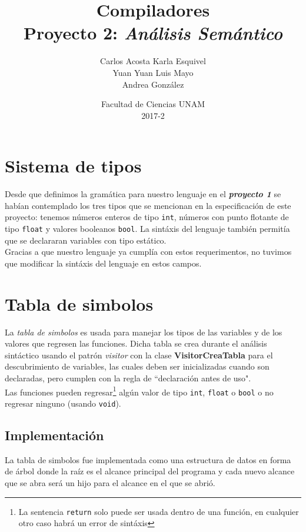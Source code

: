 \documentclass[12pt]{article}
\title{Compiladores\\ Proyecto 2: \emph{Análisis Semántico}}
\author{Carlos Acosta \qquad Karla Esquivel \\ Yuan Yuan \qquad Luis Mayo \\ Andrea González}
\date{Facultad de Ciencias UNAM \\ 2017-2}
\begin{document}
\maketitle
\tableofcontents
\newpage

\section{Sistema de tipos}
Desde que definimos la gramática para nuestro lenguaje en el \textbf{\emph{proyecto 1}} se habían contemplado los tres tipos que se mencionan en la especificación de este proyecto: tenemos números enteros de tipo \texttt{int}, números con punto flotante de tipo \texttt{float} y valores booleanos \texttt{bool}.
La sintáxis del lenguaje también permitía que se declararan variables con tipo estático. \\
Gracias a que nuestro lenguaje ya cumplía con estos requerimentos, no tuvimos que modificar la sintáxis del lenguaje en estos campos.

\section{Tabla de simbolos}
La \textit{tabla de simbolos} es usada para manejar los tipos de las variables y de los valores que regresen las funciones. Dicha tabla se crea durante el análisis sintáctico usando el patrón \textit{visitor} con la clase \textbf{VisitorCreaTabla} para el descubrimiento de variables, las cuales deben ser inicializadas cuando son declaradas, pero cumplen con la regla de ``declaración antes de uso". \\
Las funciones pueden regresar\footnote{La sentencia \texttt{return} solo puede ser usada dentro de una función, en cualquier otro caso habrá un error de sintáxis} algún valor de tipo \texttt{int}, \texttt{float} o \texttt{bool} o no regresar ninguno (usando \texttt{void}).
\subsection{Implementación}
La tabla de simbolos fue implementada como una estructura de datos en forma de árbol donde la raíz es el alcance principal del programa y cada nuevo alcance que se abra será un hijo para el alcance en el que se abrió.
\end{document}
